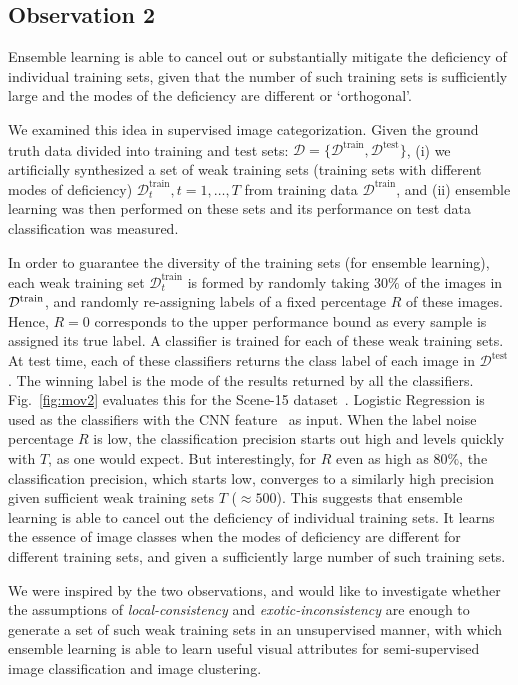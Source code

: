 \subsection{Observation 2}
\label{sec:mov2}
Ensemble learning is able to cancel out or  substantially mitigate the
deficiency of individual training sets, given that the number of such
training sets is sufficiently large and the modes of the deficiency
are different or `orthogonal'. 

We examined this idea in supervised
image categorization.  Given the ground truth data divided into training
and test sets: $\mathcal D = \{\mathcal{D}^\text{train} ,
\mathcal{D}^\text{test}\}$, (i) we artificially synthesized a set of
weak training sets (training sets with different modes of deficiency)
$\mathcal{D}^\text{train}_t, t=1,\ldots,T$ from training data
$\mathcal{D}^\text{train}$, and (ii) ensemble learning was then
performed on these sets and its performance on test data
classification was measured.

In order to guarantee the diversity of the training sets (for ensemble
learning), each weak training set $\mathcal{D}^\text{train}_t$ is
formed by randomly taking $30\%$ of the images in $\mathcal{D}^\text{train}$, and
randomly re-assigning labels of a fixed percentage $R$ of these
images. Hence, $R=0$ corresponds to the upper performance bound as
every sample is assigned its true label.  A classifier is trained for
each of these weak training sets.  At test time, each of these
classifiers returns the class label of each image in
$\mathcal{D}^\text{test}$. The winning label is the mode of the
results returned by all the classifiers.  Fig.~\ref{fig:mov2}
evaluates this for the Scene-15
dataset~\citep{lazebnik:cvpr06}. Logistic Regression is used as the
classifiers with the CNN feature~\citep{deep:bmvc14} as
input.  When the label noise percentage $R$ is low, the classification
precision starts out high and levels quickly with $T$, as one would
expect. But interestingly, for $R$ even as high as $80\%$, the
classification precision, which starts low, converges to a similarly
high precision given sufficient weak training sets $T$ ($\approx
500$).  This suggests that ensemble learning is able to cancel out the
deficiency of individual training sets. It learns the essence of image
classes when the modes of deficiency are different for different
training sets, and given a sufficiently large number of such training sets.

We were inspired by the two observations, and would like to
investigate whether the assumptions of \emph{local-consis\-tency} and
\emph{exotic-inconsistency} are enough to generate a set of such weak
training sets in an unsupervised manner, with which ensemble learning
is able to learn useful visual attributes for semi-supervised
image classification and image clustering.

